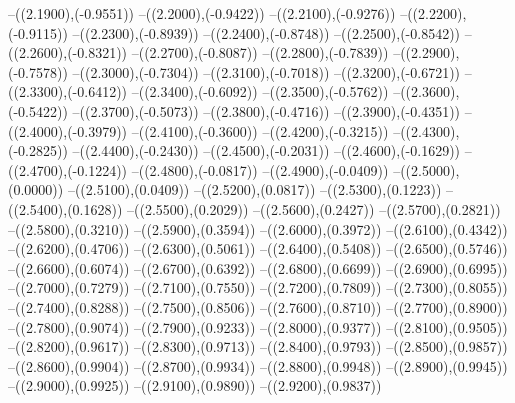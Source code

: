 {	--({\sx*(2.1900)},{\sy*(-0.9551)})
	--({\sx*(2.2000)},{\sy*(-0.9422)})
	--({\sx*(2.2100)},{\sy*(-0.9276)})
	--({\sx*(2.2200)},{\sy*(-0.9115)})
	--({\sx*(2.2300)},{\sy*(-0.8939)})
	--({\sx*(2.2400)},{\sy*(-0.8748)})
	--({\sx*(2.2500)},{\sy*(-0.8542)})
	--({\sx*(2.2600)},{\sy*(-0.8321)})
	--({\sx*(2.2700)},{\sy*(-0.8087)})
	--({\sx*(2.2800)},{\sy*(-0.7839)})
	--({\sx*(2.2900)},{\sy*(-0.7578)})
	--({\sx*(2.3000)},{\sy*(-0.7304)})
	--({\sx*(2.3100)},{\sy*(-0.7018)})
	--({\sx*(2.3200)},{\sy*(-0.6721)})
	--({\sx*(2.3300)},{\sy*(-0.6412)})
	--({\sx*(2.3400)},{\sy*(-0.6092)})
	--({\sx*(2.3500)},{\sy*(-0.5762)})
	--({\sx*(2.3600)},{\sy*(-0.5422)})
	--({\sx*(2.3700)},{\sy*(-0.5073)})
	--({\sx*(2.3800)},{\sy*(-0.4716)})
	--({\sx*(2.3900)},{\sy*(-0.4351)})
	--({\sx*(2.4000)},{\sy*(-0.3979)})
	--({\sx*(2.4100)},{\sy*(-0.3600)})
	--({\sx*(2.4200)},{\sy*(-0.3215)})
	--({\sx*(2.4300)},{\sy*(-0.2825)})
	--({\sx*(2.4400)},{\sy*(-0.2430)})
	--({\sx*(2.4500)},{\sy*(-0.2031)})
	--({\sx*(2.4600)},{\sy*(-0.1629)})
	--({\sx*(2.4700)},{\sy*(-0.1224)})
	--({\sx*(2.4800)},{\sy*(-0.0817)})
	--({\sx*(2.4900)},{\sy*(-0.0409)})
	--({\sx*(2.5000)},{\sy*(0.0000)})
	--({\sx*(2.5100)},{\sy*(0.0409)})
	--({\sx*(2.5200)},{\sy*(0.0817)})
	--({\sx*(2.5300)},{\sy*(0.1223)})
	--({\sx*(2.5400)},{\sy*(0.1628)})
	--({\sx*(2.5500)},{\sy*(0.2029)})
	--({\sx*(2.5600)},{\sy*(0.2427)})
	--({\sx*(2.5700)},{\sy*(0.2821)})
	--({\sx*(2.5800)},{\sy*(0.3210)})
	--({\sx*(2.5900)},{\sy*(0.3594)})
	--({\sx*(2.6000)},{\sy*(0.3972)})
	--({\sx*(2.6100)},{\sy*(0.4342)})
	--({\sx*(2.6200)},{\sy*(0.4706)})
	--({\sx*(2.6300)},{\sy*(0.5061)})
	--({\sx*(2.6400)},{\sy*(0.5408)})
	--({\sx*(2.6500)},{\sy*(0.5746)})
	--({\sx*(2.6600)},{\sy*(0.6074)})
	--({\sx*(2.6700)},{\sy*(0.6392)})
	--({\sx*(2.6800)},{\sy*(0.6699)})
	--({\sx*(2.6900)},{\sy*(0.6995)})
	--({\sx*(2.7000)},{\sy*(0.7279)})
	--({\sx*(2.7100)},{\sy*(0.7550)})
	--({\sx*(2.7200)},{\sy*(0.7809)})
	--({\sx*(2.7300)},{\sy*(0.8055)})
	--({\sx*(2.7400)},{\sy*(0.8288)})
	--({\sx*(2.7500)},{\sy*(0.8506)})
	--({\sx*(2.7600)},{\sy*(0.8710)})
	--({\sx*(2.7700)},{\sy*(0.8900)})
	--({\sx*(2.7800)},{\sy*(0.9074)})
	--({\sx*(2.7900)},{\sy*(0.9233)})
	--({\sx*(2.8000)},{\sy*(0.9377)})
	--({\sx*(2.8100)},{\sy*(0.9505)})
	--({\sx*(2.8200)},{\sy*(0.9617)})
	--({\sx*(2.8300)},{\sy*(0.9713)})
	--({\sx*(2.8400)},{\sy*(0.9793)})
	--({\sx*(2.8500)},{\sy*(0.9857)})
	--({\sx*(2.8600)},{\sy*(0.9904)})
	--({\sx*(2.8700)},{\sy*(0.9934)})
	--({\sx*(2.8800)},{\sy*(0.9948)})
	--({\sx*(2.8900)},{\sy*(0.9945)})
	--({\sx*(2.9000)},{\sy*(0.9925)})
	--({\sx*(2.9100)},{\sy*(0.9890)})
	--({\sx*(2.9200)},{\sy*(0.9837)})
}
